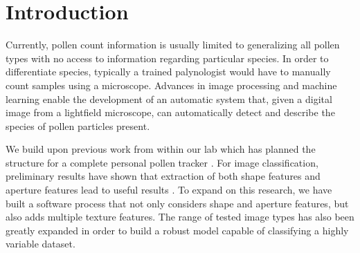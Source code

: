\section{Introduction}

Currently, pollen count information is usually limited to generalizing all pollen types with no access to information regarding particular species. In order to differentiate species, typically a trained palynologist would have to manually count samples using a microscope. Advances in image processing and machine learning enable the development of an automatic system that, given a digital image from a lightfield microscope, can automatically detect and describe the species of pollen particles present.

We build upon previous work from within our lab which has planned the structure for a complete personal pollen tracker \cite{Lozano_2012}. For image classification, preliminary results have shown that extraction of both shape features and aperture features lead to useful results \cite{Lozano_2014}. To expand on this research, we have built a software process that not only considers shape and aperture features, but also adds multiple texture features. The range of tested image types has also been greatly expanded in order to build a robust model capable of classifying a highly variable dataset. 

  
  
  